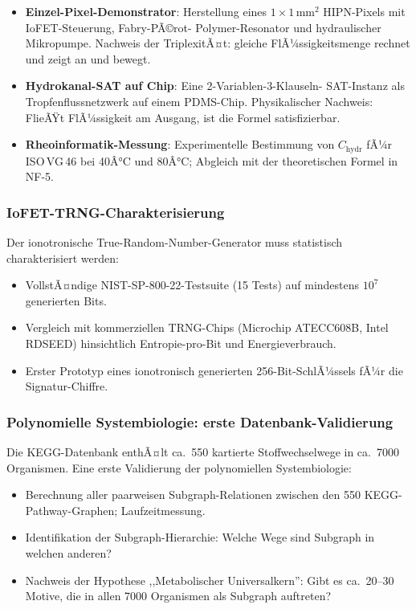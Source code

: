 ﻿\documentclass[a4paper,12pt]{scrreprt}
\theoremstyle{definition}
\begin{document}
\begin{itemize}
  \item \textbf{Einzel-Pixel-Demonstrator}: Herstellung eines
    $1 \times 1$\,mm$^2$ HIPN-Pixels mit IoFET-Steuerung, Fabry-PÃ©rot-
    Polymer-Resonator und hydraulischer Mikropumpe. Nachweis der
    TriplexitÃ¤t: gleiche FlÃ¼ssigkeitsmenge rechnet und zeigt an und bewegt.
  \item \textbf{Hydrokanal-SAT auf Chip}: Eine 2-Variablen-3-Klauseln-
    SAT-Instanz als Tropfenflussnetzwerk auf einem PDMS-Chip.  
    Physikalischer Nachweis: FlieÃŸt FlÃ¼ssigkeit am Ausgang, ist die Formel
    satisfizierbar.
  \item \textbf{Rheoinformatik-Messung}: Experimentelle Bestimmung von
    $C_\mathrm{hydr}$ fÃ¼r ISO\,VG\,46 bei 40Â°C und 80Â°C; Abgleich
    mit der theoretischen Formel in NF-5.
\end{itemize}

\subsubsection{IoFET-TRNG-Charakterisierung}

Der ionotronische True-Random-Number-Generator muss statistisch
charakterisiert werden:
\begin{itemize}
  \item VollstÃ¤ndige NIST-SP-800-22-Testsuite (15 Tests) auf
    mindestens $10^7$ generierten Bits.
  \item Vergleich mit kommerziellen TRNG-Chips (Microchip ATECC608B,
    Intel RDSEED) hinsichtlich Entropie-pro-Bit und Energieverbrauch.
  \item Erster Prototyp eines ionotronisch generierten 256-Bit-SchlÃ¼ssels
    fÃ¼r die Signatur-Chiffre.
\end{itemize}

\subsubsection{Polynomielle Systembiologie: erste Datenbank-Validierung}

Die KEGG-Datenbank enthÃ¤lt ca.\ 550 kartierte Stoffwechselwege in ca.\
7000 Organismen. Eine erste Validierung der polynomiellen Systembiologie:
\begin{itemize}
  \item Berechnung aller paarweisen Subgraph-Relationen zwischen den
    550 KEGG-Pathway-Graphen; Laufzeitmessung.
  \item Identifikation der Subgraph-Hierarchie: Welche Wege sind Subgraph
    in welchen anderen?
  \item Nachweis der Hypothese ,,Metabolischer Universalkern'': Gibt es
    ca.\ 20--30 Motive, die in allen 7000 Organismen als Subgraph auftreten?
\end{itemize}
\end{document}
